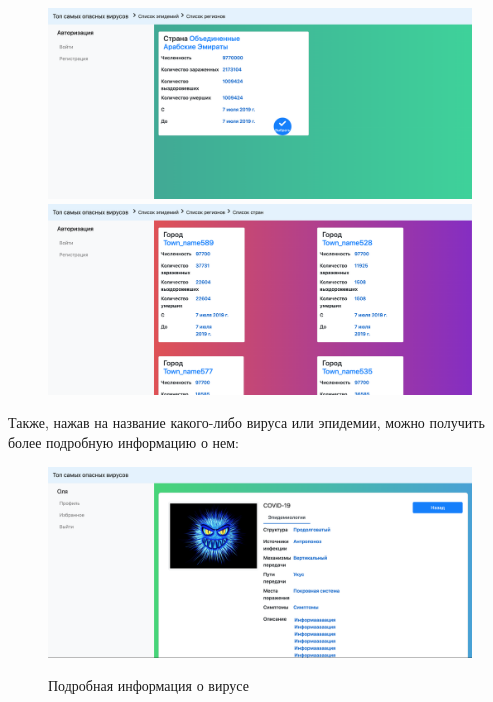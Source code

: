 \documentclass[a4paper,14pt]{extarticle}
\begin{document}
 	\begin{figure}[h!]
 		\begin{minipage}[b]{0.45\textwidth}
 			\includegraphics[width=\textwidth]{examples/country.png}
 		\end{minipage}
 		\begin{minipage}[b]{0.45\textwidth}
 			\includegraphics[width=\textwidth]{examples/town.png}
 		\end{minipage}
 		\label{ris:country_town}
 	\end{figure}
 
 	Также, нажав на название какого-либо вируса или эпидемии, можно получить более подробную информацию о нем:
 	
 	\begin{figure}[h!]
 		\begin{center}
 			{\includegraphics[width = \textwidth]{examples/more_virus.png}}
 			\caption{
 				Подробная информация о вирусе}
 			\label{ris:more_virus}
 		\end{center}
 	\end{figure}
 
\end{document}
